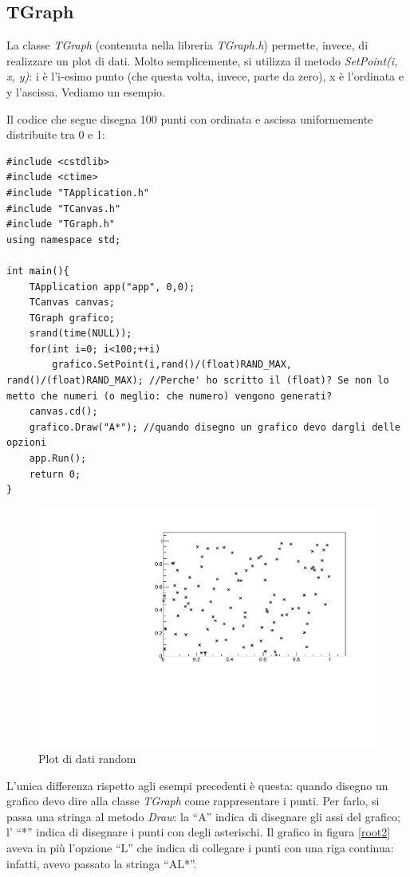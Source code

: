 \subsection{TGraph}
La classe \emph{TGraph} (contenuta nella libreria \emph{TGraph.h}) permette, invece, di realizzare un plot di dati. Molto semplicemente, si utilizza il metodo \emph{SetPoint(i, x, y)}: i è l'i-esimo punto (che questa volta, invece, parte da zero), x è l'ordinata e y l'ascissa.  Vediamo un esempio. 

Il codice che segue disegna 100 punti con ordinata e ascissa uniformemente distribuite tra 0 e 1:

\begin{lstlisting}[label=esroot1]
#include <cstdlib>
#include <ctime>
#include "TApplication.h"
#include "TCanvas.h"
#include "TGraph.h"
using namespace std;

int main(){
	TApplication app("app", 0,0);
	TCanvas canvas;
	TGraph grafico; 
	srand(time(NULL));    
	for(int i=0; i<100;++i) 
		grafico.SetPoint(i,rand()/(float)RAND_MAX,  rand()/(float)RAND_MAX); //Perche' ho scritto il (float)? Se non lo metto che numeri (o meglio: che numero) vengono generati?
	canvas.cd();
	grafico.Draw("A*"); //quando disegno un grafico devo dargli delle opzioni
	app.Run();
	return 0;
}

\end{lstlisting}
\begin{figure} [ht]
	\centering
	\includegraphics[scale=\scaledim]{Immagini/randomplot.pdf}  
	\caption{Plot di dati random}
	\label{root5}
\end{figure}

L'unica differenza rispetto agli esempi precedenti è questa: quando disegno un grafico devo dire alla classe \emph{TGraph} come rappresentare i punti. Per farlo, si passa una stringa al metodo \emph{Draw}: la ``A'' indica di disegnare gli assi del grafico; l' ``*'' indica di disegnare i punti con degli asterischi. Il grafico in figura \ref{root2} aveva in più l'opzione ``L'' che indica di collegare i punti con una riga continua: infatti, avevo passato la stringa ``AL*''.

